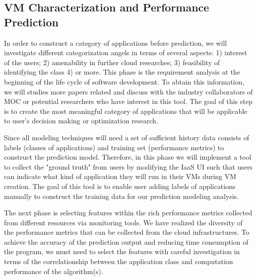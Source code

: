 \subsection{VM Characterization and Performance Prediction}

In order to construct a category of applications before prediction, we will investigate different categorization angels in terms of several aspects: 1) interest of the users; 2) amenability in further cloud researches; 3) feasibility of identifying the class 4) or more. This phase is the requirement analysis at the beginning of the life cycle of software development. To abtain this information, we will studies more papers related and discuss with the industry collaborators of MOC or potential researchers who have interest in this tool. The goal of this step is to create the most meaningful category of applications that will be applicable to user's decision making or optimization research.

Since all modeling techniques will need a set of sufficient history data consists of labels (classes of applications) and training set (performance metrics) to construct the prediction model. Therefore, in this phase we will implement a tool to collect the "ground truth" from users by modifying the IaaS UI such that users can indicate what kind of application they will run in their VMs during VM creation. The goal of this tool is to enable user adding labels of applications manually to construct the training data for our prediction modeling analysis.

The next phase is selecting features within the rich performance metrics collected from different resources via monitoring tools. We have realized the diversity of the performance metrics that can be collected from the cloud infrastructures. To achieve the accuracy of the prediction output and reducing time consumption of the program, we must need to select the features with careful investigation in terms of the correlationship between the application class and computation performance of the algorithm(s).
